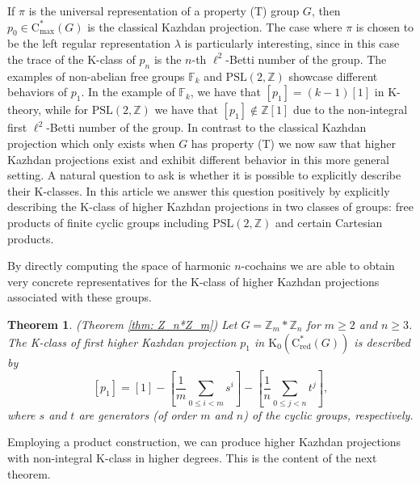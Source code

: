 \documentclass[a4paper,leqno,12pt]{article}
\numberwithin{equation}{section}
\theoremstyle{plain}
\newtheorem{introtheorem}{Theorem}
\theoremstyle{definition}
\theoremstyle{remark}
\newcommand{\Cs}{\mathrm{C}^*}
\newcommand{\Csr}{\mathrm{C}^*_{\text{red}}}
\begin{document}
	If $\pi$ is the universal representation of a property (T) group $G$, then  $p_0 \in \Cs_{\mathrm {max}} (G)$ is the classical Kazhdan projection.			
	The case where $\pi$ is chosen to be the left regular representation 
	$\lambda $ is particularly interesting, since in this case the trace of the K-class of $p_n$ is the $n$-th $\ell^2$-Betti number of the group. 
	The examples of non-abelian free groups $\mathbb F_k$ and 
	$\mathrm{PSL}(2, \mathbb Z)$ showcase different behaviors of $p_1$.
	In the example of $\mathbb F_k$, we have that $[p_1] = (k - 1)[1]$ in K-theory, while for $\mathrm{PSL}(2, \mathbb Z)$ we have that $[p_1] \notin \mathbb Z [1]$  due to the non-integral first $\ell^2$-Betti number of the group. 	In contrast to the classical Kazhdan projection which only exists when $G$ has property (T) we now saw that higher Kazhdan projections exist and exhibit different behavior in this more general setting. 
	A natural question to ask is whether it is possible to explicitly describe their K-classes. In this article we answer this question positively by explicitly describing the K-class of higher Kazhdan projections in two classes of groups: free products of finite cyclic groups including $\mathrm {PSL(2, \mathbb Z)}$ and certain Cartesian products. 
	
	By directly computing the space of harmonic  $n$-cochains we are able to obtain very concrete representatives for the K-class of higher Kazhdan projections associated with these groups.
	
	\begin{introtheorem} \label{thm A}
		(Theorem \ref{thm: Z_n*Z_m}) 
		Let $G= \mathbb Z_m \ast \mathbb Z_n$ for $m \geq 2$ and $n \geq 3$. The K-class of first higher Kazhdan projection $p_1$ in $\mathrm K_0(\Csr(G))$ is described by
		\[
			[p_1] = [1] - \left[\frac{1}{m}
			\sum_{0 \leq i < m}{s^i}\right] - 
			\left[\frac{1}{n}{\sum_{0 \leq j <n}{t^j}} \right],
		\]
		where $s$ and $t$ are generators (of order $m$ and $n$) of the cyclic groups, respectively.
	\end{introtheorem}
	
	Employing a product construction, we can produce higher Kazhdan projections with non-integral K-class in higher degrees. This is the content of the next theorem.
	
\end{document}
